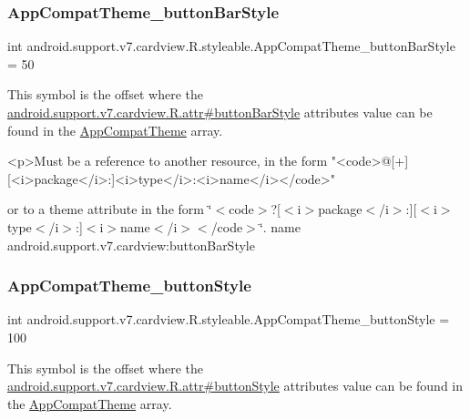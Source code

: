 \subsubsection{\texorpdfstring{App\+Compat\+Theme\+\_\+button\+Bar\+Style}{AppCompatTheme\_buttonBarStyle}}
{\footnotesize\ttfamily int android.\+support.\+v7.\+cardview.\+R.\+styleable.\+App\+Compat\+Theme\+\_\+button\+Bar\+Style = 50\hspace{0.3cm}{\ttfamily [static]}}

This symbol is the offset where the \hyperlink{classandroid_1_1support_1_1v7_1_1cardview_1_1R_1_1attr_ab1d867a0e1fdb554c96a74370d222077}{android.\+support.\+v7.\+cardview.\+R.\+attr\#button\+Bar\+Style} attribute\textquotesingle{}s value can be found in the \hyperlink{classandroid_1_1support_1_1v7_1_1cardview_1_1R_1_1styleable_a52e6f69f954ecc2622d72c0b4d298938}{App\+Compat\+Theme} array.

\begin{DoxyVerb}      <p>Must be a reference to another resource, in the form "<code>@[+][<i>package</i>:]<i>type</i>:<i>name</i></code>"
\end{DoxyVerb}
 or to a theme attribute in the form \char`\"{}$<$code$>$?\mbox{[}$<$i$>$package$<$/i$>$\+:\mbox{]}\mbox{[}$<$i$>$type$<$/i$>$\+:\mbox{]}$<$i$>$name$<$/i$>$$<$/code$>$\char`\"{}.  name android.\+support.\+v7.\+cardview\+:button\+Bar\+Style \mbox{\label{classandroid_1_1support_1_1v7_1_1cardview_1_1R_1_1styleable_a604ddffad2b433e9cf1cfb3aa9f82a43}} 
\subsubsection{\texorpdfstring{App\+Compat\+Theme\+\_\+button\+Style}{AppCompatTheme\_buttonStyle}}
{\footnotesize\ttfamily int android.\+support.\+v7.\+cardview.\+R.\+styleable.\+App\+Compat\+Theme\+\_\+button\+Style = 100\hspace{0.3cm}{\ttfamily [static]}}

This symbol is the offset where the \hyperlink{classandroid_1_1support_1_1v7_1_1cardview_1_1R_1_1attr_a3c726b0f612e7a0056b16b933edf2d12}{android.\+support.\+v7.\+cardview.\+R.\+attr\#button\+Style} attribute\textquotesingle{}s value can be found in the \hyperlink{classandroid_1_1support_1_1v7_1_1cardview_1_1R_1_1styleable_a52e6f69f954ecc2622d72c0b4d298938}{App\+Compat\+Theme} array.

